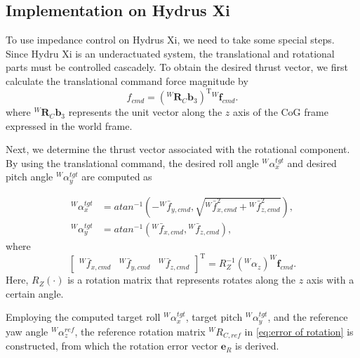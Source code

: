 \subsection{Implementation on Hydrus Xi}
To use impedance control on Hydrus Xi, we need to take some special steps. Since Hydru Xi is an underactuated system, the translational and rotational parts must be controlled cascadely.
To obtain the desired thrust vector, we first calculate the translational command force magnitude by
\begin{equation}
\label{eq:thrust translation 1}
f_{cmd}=(^W\!\boldsymbol{R}_{C}\boldsymbol{b}_3)^{\mathrm{T}}
{^W\!\boldsymbol{f}_{cmd}}.
\end{equation}
where $^{W}\boldsymbol{R}_{C}\boldsymbol{b}_3$ represents the unit vector along the $z$ axis of the CoG frame expressed in the world frame.


Next, we determine the thrust vector associated with the rotational component. By using the translational command, the desired roll angle $^W\!\alpha^{tgt}_x$ and desired pitch angle $^W\!\alpha^{tgt}_y$ are computed as


\begin{subequations}
\label{eq:target roll and pitch angle}
\begin{align}
    {^W\!\alpha^{tgt}_x}&=atan^{-1}(-{^W\!\bar{f}_{y,cmd}},\sqrt{{^W\!\bar{f}_{x,cmd}^2}+{^W\!\bar{f}_{z,cmd}^2}}), \\[2pt]
    {^W\!\alpha^{tgt}_y}&=atan^{-1}(^W\!\bar{f}_{x,cmd},{^W\!\bar{f}_{z,cmd}}),
\end{align}
\end{subequations}
where
\begin{equation}
\label{eq:imp cmd for trans}
    \begin{bmatrix}
^W\!\bar{f}_{x,cmd} & ^W\!\bar{f}_{y,cmd} & ^W\!\bar{f}_{z,cmd}
\end{bmatrix}^{\mathrm{T}}=R^{-1}_Z(^W\!\alpha_z)^W\!\boldsymbol{f}_{cmd}.
\end{equation}
Here, $R_Z(\cdot{})$ is a rotation matrix that represents rotates along the $z$ axis with a certain angle.

Employing the computed target roll $^W\!\alpha^{tgt}_x$, target pitch $^W\!\alpha^{tgt}_y$, and the reference yaw angle $^W\!\alpha^{ref}_z$, the reference rotation matrix $^W\!R_{C,ref}$ in \eqref{eq:error of rotation} is constructed, from which the rotation error vector ${\boldsymbol{e}_R}$ is derived. 



